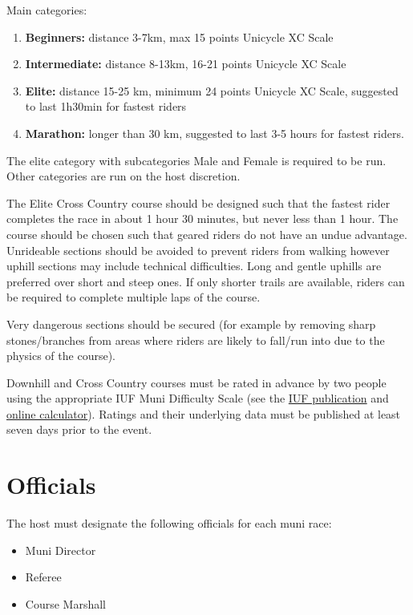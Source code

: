Main categories:
\begin{enumerate}
\item \textbf{Beginners:} distance 3-7km, max 15 points Unicycle XC Scale
\item \textbf{Intermediate:} distance 8-13km, 16-21 points Unicycle XC Scale
\item \textbf{Elite:} distance 15-25 km, minimum 24 points Unicycle XC Scale, suggested to last 1h30min for fastest riders
\item \textbf{Marathon:} longer than 30 km, suggested to last 3-5 hours for fastest riders.
\end{enumerate}

The elite category with subcategories Male and Female is required to be run.
Other categories are run on the host discretion.

The Elite Cross Country course should be designed such that the fastest rider completes the race in about 1 hour 30 minutes, but never less than 1 hour.
The course should be chosen such that geared riders do not have an undue advantage.
Unrideable sections should be avoided to prevent riders from walking however uphill sections may include technical difficulties.
Long and gentle uphills are preferred over short and steep ones.
If only shorter trails are available, riders can be required to complete multiple laps of the course.

Very dangerous sections should be secured (for example by removing sharp stones/branches from areas where riders are likely to fall/run into due to the physics of the course).

Downhill and Cross Country courses must be rated in advance by two people using the appropriate IUF Muni Difficulty Scale (see the \href{https://unicycling.org/files/iuf-muni-difficulty-scale.pdf}{IUF publication} and \href{https://muni-scale.info/}{online calculator}).
Ratings and their underlying data must be published at least seven days prior to the event.

\section{Officials}

The host must designate the following officials for each muni race:
\begin{itemize}
\item Muni Director
\item Referee
\item Course Marshall
\end{itemize}

